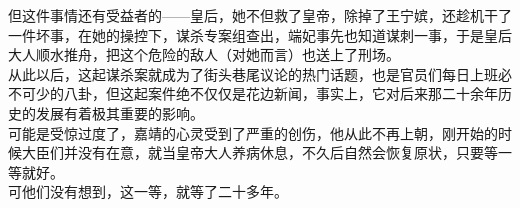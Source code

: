 \begin{multicols}{\theparacolNo}
但这件事情还有受益者的——皇后，她不但救了皇帝，除掉了王宁嫔，还趁机干了一件坏事，在她的操控下，谋杀专案组查出，端妃事先也知道谋刺一事，于是皇后大人顺水推舟，把这个危险的敌人（对她而言）也送上了刑场。\\

从此以后，这起谋杀案就成为了街头巷尾议论的热门话题，也是官员们每日上班必不可少的八卦，但这起案件绝不仅仅是花边新闻，事实上，它对后来那二十余年历史的发展有着极其重要的影响。\\

可能是受惊过度了，嘉靖的心灵受到了严重的创伤，他从此不再上朝，刚开始的时候大臣们并没有在意，就当皇帝大人养病休息，不久后自然会恢复原状，只要等一等就好。\\

可他们没有想到，这一等，就等了二十多年。\\
\ifnum{}
	\end{multicols}
\fi
\newpage
